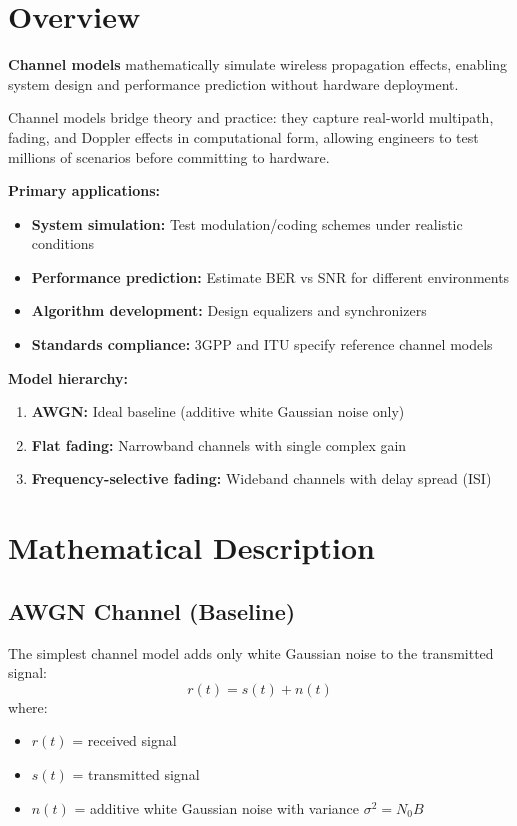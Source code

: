 \section{Overview}

\textbf{Channel models} mathematically simulate wireless propagation effects, enabling system design and performance prediction without hardware deployment.

\begin{keyconcept}
Channel models bridge theory and practice: they capture real-world multipath, fading, and Doppler effects in computational form, allowing engineers to test millions of scenarios before committing to hardware.
\end{keyconcept}

\textbf{Primary applications:}
\begin{itemize}
\item \textbf{System simulation:} Test modulation/coding schemes under realistic conditions
\item \textbf{Performance prediction:} Estimate BER vs SNR for different environments
\item \textbf{Algorithm development:} Design equalizers and synchronizers
\item \textbf{Standards compliance:} 3GPP and ITU specify reference channel models
\end{itemize}

\textbf{Model hierarchy:}
\begin{enumerate}
\item \textbf{AWGN:} Ideal baseline (additive white Gaussian noise only)
\item \textbf{Flat fading:} Narrowband channels with single complex gain
\item \textbf{Frequency-selective fading:} Wideband channels with delay spread (ISI)
\end{enumerate}

\section{Mathematical Description}

\subsection{AWGN Channel (Baseline)}

The simplest channel model adds only white Gaussian noise to the transmitted signal:
\begin{equation}
r(t) = s(t) + n(t)
\end{equation}
where:
\begin{itemize}
\item $r(t)$ = received signal
\item $s(t)$ = transmitted signal
\item $n(t)$ = additive white Gaussian noise with variance $\sigma^2 = N_0 B$
\end{itemize}

